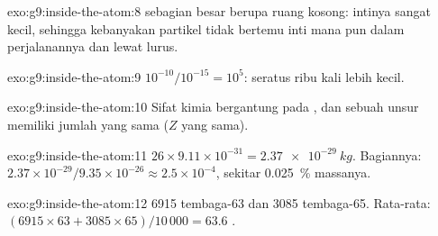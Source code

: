 \begin{solution}{exo:g9:inside-the-atom:8}
 sebagian besar berupa ruang kosong: intinya sangat kecil, sehingga
kebanyakan partikel tidak bertemu inti mana pun dalam perjalanannya dan
lewat lurus.
\end{solution}

\begin{solution}{exo:g9:inside-the-atom:9}
$10^{-10} / 10^{-15} = 10^{5}$: seratus ribu kali lebih kecil.
\end{solution}

\begin{solution}{exo:g9:inside-the-atom:10}
Sifat kimia bergantung pada , dan  sebuah unsur
memiliki jumlah  yang sama ($Z$ yang sama).
\end{solution}

\begin{solution}{exo:g9:inside-the-atom:11}
$26 \times 9.11 \times 10^{-31} = \qty{2.37e-29}{kg}$. Bagiannya:
$2.37 \times 10^{-29} / 9.35 \times 10^{-26} \approx 2.5 \times
10^{-4}$, sekitar \qty{0.025}{\percent} massanya.
\end{solution}

\begin{solution}{exo:g9:inside-the-atom:12}
6915  tembaga-63 dan 3085  tembaga-65. Rata-rata:
$(6915 \times 63 + 3085 \times 65)/10\,000 = 63.6$ .
\end{solution}

